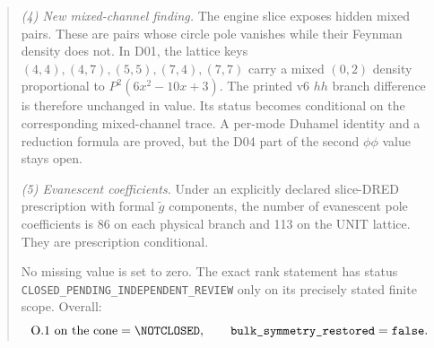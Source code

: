 \begin{abstract}
\emph{(4) New mixed-channel finding.} The engine slice exposes
hidden mixed pairs. These are pairs whose circle pole vanishes
while their Feynman density does not. In D01, the lattice keys
\((4,4),(4,7),(5,5),(7,4),(7,7)\) carry a mixed
\((0,2)\) density proportional to \(P^2(6x^2-10x+3)\).
The printed v6 \(hh\) branch difference is therefore unchanged in
value. Its status becomes conditional on the corresponding
mixed-channel trace. A per-mode Duhamel identity and a reduction
formula are proved, but the D04 part of the second \(\phi\phi\)
value stays open.

\emph{(5) Evanescent coefficients.} Under an explicitly declared
slice-DRED prescription with formal \(\tilde g\) components, the
number of evanescent pole coefficients is 86 on each physical
branch and 113 on the UNIT lattice. They are prescription
conditional.

No missing value is set to zero.
The exact rank statement has status
\texttt{CLOSED\_PENDING\_}\allowbreak\texttt{INDEPENDENT\_REVIEW}
only on its precisely stated finite scope. Overall:
\[
 \text{O.1 on the cone}=\NOTCLOSED,\qquad
 \texttt{bulk\_symmetry\_restored}=\texttt{false}.
\]
\end{abstract}
